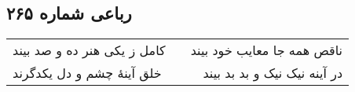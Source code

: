 \begin{center}
\section*{رباعی شماره ۲۶۵}
\label{sec:sh265}
\begin{longtable}{l p{0.5cm} r}
کامل ز یکی هنر ده و صد بیند
&&
ناقص همه جا معایب خود بیند
\\
خلق آینهٔ چشم و دل یکدگرند
&&
در آینه نیک نیک و بد بد بیند
\\
\end{longtable}
\end{center}
